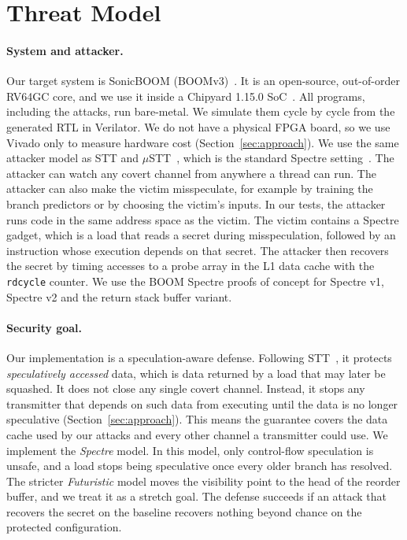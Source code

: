 \section{Threat Model}
\label{sec:threat}

\paragraph{System and attacker.}
Our target system is SonicBOOM (BOOMv3)~\cite{Zhao:SonicBOOM:2020}. It is an
open-source, out-of-order RV64GC core, and we use it inside a Chipyard 1.15.0
SoC~\cite{Amid:Chipyard:2020}. All programs, including the attacks, run bare-metal. We
simulate them cycle by cycle from the generated RTL in Verilator. We do not have a
physical FPGA board, so we use Vivado only to measure hardware cost
(Section~\ref{sec:approach}). We use the same attacker model as STT and
$\mu$STT~\cite{Yu:STT:2019,Chen:uSTT:2025}, which is the standard Spectre
setting~\cite{SpectreBase}. The attacker can watch any covert channel from anywhere a
thread can run. The attacker can also make the victim misspeculate, for example by
training the branch predictors or by choosing the victim's inputs. In our tests, the
attacker runs code in the same address space as the victim. The victim contains a
Spectre gadget, which is a load that reads a secret during misspeculation, followed by
an instruction whose execution depends on that secret. The attacker then recovers the
secret by timing accesses to a probe array in the L1 data cache with the
\texttt{rdcycle} counter. We use the BOOM Spectre proofs of concept for Spectre v1,
Spectre v2 and the return stack buffer variant.

\paragraph{Security goal.}
Our implementation is a speculation-aware defense. Following STT~\cite{Yu:STT:2019}, it
protects \emph{speculatively accessed} data, which is data returned by a load that may
later be squashed. It does not close any single covert channel. Instead, it stops any
transmitter that depends on such data from executing until the data is no longer
speculative (Section~\ref{sec:approach}). This means the guarantee covers the data
cache used by our attacks and every other channel a transmitter could use. We implement
the \emph{Spectre} model. In this model, only control-flow speculation is unsafe, and a
load stops being speculative once every older branch has resolved. The stricter
\emph{Futuristic} model moves the visibility point to the head of the reorder buffer,
and we treat it as a stretch goal. The defense succeeds if an attack that recovers the
secret on the baseline recovers nothing beyond chance on the protected configuration.

